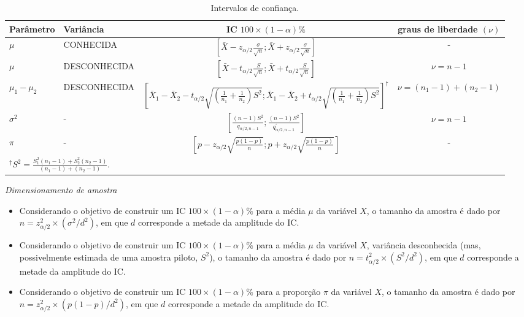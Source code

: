 \documentclass[10pt]{article}%
\renewcommand{\ra}[1]{\renewcommand{\arraystretch}{#1}}
\begin{document}
\begin{table*}[ht]\centering
\ra{1.3}
{\footnotesize
\caption{Intervalos de confiança.}
\begin{tabular}{@{}llcc@{}}\toprule
Parâmetro & Variância & IC $100\times (1-\alpha)\%$ & graus de liberdade $(\nu)$\\
\midrule
$\mu$ & CONHECIDA &$\displaystyle{\left[\bar{X} - z_{\alpha/2}\frac{\sigma}{\sqrt{n}};\bar{X} + z_{\alpha/2}\frac{\sigma}{\sqrt{n}}\right]}$ & - \\
\midrule
$\mu$ & DESCONHECIDA & $\displaystyle{\left[\bar{X} - t_{\alpha/2}\frac{S}{\sqrt{n}};\bar{X} + t_{\alpha/2}\frac{S}{\sqrt{n}}\right]}$ & $\nu = n - 1$ \\
\midrule
$\mu_1 - \mu_2$ & DESCONHECIDA & $\displaystyle{\left[\bar{X}_1 - \bar{X}_2 - t_{\alpha/2}\sqrt{\left(\frac{1}{n_1} + \frac{1}{n_2}\right)S^2};\bar{X}_1 - \bar{X}_2 + t_{\alpha/2}\sqrt{\left(\frac{1}{n_1} + \frac{1}{n_2}\right)S^2}\right]}^{\dag}$ & $\nu = (n_1 - 1) + (n_2 - 1)$\\
\midrule
$\sigma^2$ & - & $\displaystyle{\left[\frac{(n-1)S^2}{q_{\alpha/2, n-1}};\frac{(n-1)S^2}{q^{'}_{\alpha/2, n-1}}\right]}$ & $\nu = n - 1$ \\
\midrule
$\pi$ & - &$\displaystyle{\left[p - z_{\alpha/2}\sqrt{\frac{p(1 - p)}{n}};p + z_{\alpha/2}\sqrt{\frac{p(1 - p)}{n}}\right]}$ & - \\
\hline
\multicolumn{4}{l}{$^{\dag} S^2 = \frac{S_1^2(n_1 - 1) + S_2^2(n_2 - 1)}{(n_1 - 1) + (n_2 - 1)}$.}\\
\bottomrule
\end{tabular}
}
\end{table*}

\emph{Dimensionamento de amostra}

\begin{itemize}
\item Considerando o objetivo de construir um IC $100\times (1-\alpha)\%$ para a média $\mu$ da variável $X$, o tamanho da amostra é dado por $n = z_{\alpha/2}^2\times(\sigma^2/d^2)$, em que $d$ corresponde a metade da amplitude do IC.
\item Considerando o objetivo de construir um IC $100\times (1-\alpha)\%$ para a média $\mu$ da variável $X$, variância desconhecida (mas, possivelmente estimada de uma amostra piloto, $S^2$), o tamanho da amostra é dado por $n = t_{\alpha/2}^2\times(S^2/d^2)$, em que $d$ corresponde a metade da amplitude do IC.
\item Considerando o objetivo de construir um IC $100\times (1-\alpha)\%$ para a proporção $\pi$ da variável $X$, o tamanho da amostra é dado por $n = z_{\alpha/2}^2\times(p(1-p)/d^2)$, em que $d$ corresponde a metade da amplitude do IC.
\end{itemize}
\end{document}
